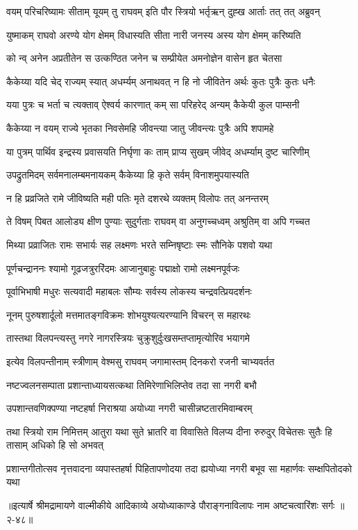 \twolineshloka
{वयम् परिचरिष्यामः सीताम् यूयम् तु राघवम्}
{इति पौर स्त्रियो भर्तृऋन् दुह्ख आर्ताः तत् तत् अब्रुवन्} %

\twolineshloka
{युष्माकम् राघवो अरण्ये योग क्षेमम् विधास्यति}
{सीता नारी जनस्य अस्य योग क्षेमम् करिष्यति} %

\twolineshloka
{को न्व् अनेन अप्रतीतेन स उत्कण्ठित जनेन च}
{सम्प्रीयेत अमनोज्ञेन वासेन हृत चेतसा} %

\twolineshloka
{कैकेय्या यदि चेद् राज्यम् स्यात् अधर्म्यम् अनाथवत्}
{न हि नो जीवितेन अर्थः कुतः पुत्रैः कुतः धनैः} %

\twolineshloka
{यया पुत्रः च भर्ता च त्यक्ताव् ऐश्वर्य कारणात्}
{कम् सा परिहरेद् अन्यम् कैकेयी कुल पाम्सनी} %

\twolineshloka
{कैकेय्या न वयम् राज्ये भृतका निवसेमहि}
{जीवन्त्या जातु जीवन्त्यः पुत्रैः अपि शपामहे} %

\twolineshloka
{या पुत्रम् पार्थिव इन्द्रस्य प्रवासयति निर्घृणा}
{कः ताम् प्राप्य सुखम् जीवेद् अधर्म्याम् दुष्ट चारिणीम्} %

\twolineshloka
{उपद्रुतमिदम् सर्वमनालम्बमनायकम्}
{कैकेय्या हि कृते सर्वम् विनाशमुपयास्यति} %

\twolineshloka
{न हि प्रव्रजिते रामे जीविष्यति मही पतिः}
{मृते दशरथे व्यक्तम् विलोपः तत् अनन्तरम्} %

\twolineshloka
{ते विषम् पिबत आलोड्य क्षीण पुण्याः सुदुर्गताः}
{राघवम् वा अनुगच्चध्वम् अश्रुतिम् वा अपि गच्चत} %

\twolineshloka
{मिथ्या प्रव्राजितः रामः सभार्यः सह लक्ष्मणः}
{भरते सम्निषृष्टाः स्मः सौनिके पशवो यथा} %

\twolineshloka
{पूर्णचन्द्राननः श्यामो गूढजत्रुररिंदमः}
{आजानुबाहुः पद्माक्षो रामो लक्ष्मनपूर्वजः} %

\twolineshloka
{पूर्वाभिभाषी मधुरः सत्यवादी महाबलः}
{सौम्यः सर्वस्य लोकस्य चन्द्रवत्प्रियदर्शनः} %

\twolineshloka
{नूनम् पुरुषशार्दूलो मत्तमातङ्गविक्रमः}
{शोभयुश्यत्यरण्यानि विचरन् स महारथः} %

\twolineshloka
{तास्तथा विलपन्त्यस्तु नगरे नागरस्त्रियः}
{चुक्रुशुर्दुःखसम्तप्तामृत्योरिव भयागमे} %

\twolineshloka
{इत्येव विलपन्तीनाम् स्त्रीणाम् वेश्मसु राघवम्}
{जगामास्तम् दिनकरो रजनी चाभ्यवर्तत} %

\twolineshloka
{नष्टज्वलनसम्पाता प्रशान्ताध्यायसत्कथा}
{तिमिरेणाभिलिप्तेव तदा सा नगरी बभौ} %

\twolineshloka
{उपशान्तवणिक्पण्या नष्टहर्षा निराश्रया}
{अयोध्या नगरी चासीन्नष्टतारमिवाम्बरम्} %

\fourlineindentedshloka
{तथा स्त्रियो राम निमित्तम् आतुरा}
{यथा सुते भ्रातरि वा विवासिते}
{विलप्य दीना रुरुदुर् विचेतसः}
{सुतैः हि तासाम् अधिको हि सो अभवत्} %

\fourlineindentedshloka
{प्रशान्तगीतोत्सव नृत्तवादना}
{व्यपास्तहर्षा पिहितापणोदया}
{तदा ह्ययोध्या नगरी बभूव सा}
{महार्णवः सम्क्षपितोदको यथा} %


॥इत्यार्षे श्रीमद्रामायणे वाल्मीकीये आदिकाव्ये अयोध्याकाण्डे पौराङ्गनाविलापः नाम अष्टचत्वारिंशः सर्गः ॥२-४८॥
